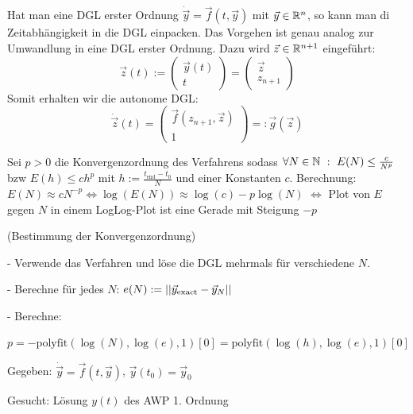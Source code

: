 
Hat man eine DGL erster Ordnung $\dot{\vec{y}} = \vec{f}(t,\vec{y})$ mit $\vec{y} \in \mathbb{R}^n$,
so kann man di Zeitabhängigkeit in die DGL einpacken. Das Vorgehen ist genau analog zur
Umwandlung in eine DGL erster Ordnung. Dazu wird $\vec{z} \in \mathbb{R}^{n+1}$ eingeführt:
$$
    \vec{z} (t) := \begin{pmatrix}
        \vec{y} (t) \\ t
    \end{pmatrix}
    =
    \begin{pmatrix}
        \vec{z} \\ z_{n+1}
    \end{pmatrix}
$$
Somit erhalten wir die autonome DGL:
$$
    \dot{\vec{z}} (t) = \begin{pmatrix}
        \vec{f} (z_{n+1} , \vec{z}) \\ 1
    \end{pmatrix}
    =: \vec{g} (\vec{z})
$$

\vspace{1\baselineskip}


Sei $p > 0$ die Konvergenzordnung des Verfahrens sodass $\forall N \in \mathbb{N} \ : \
E(N) \leq \frac{c}{N^p}$ bzw $E(h) \leq c h^p$ mit $h:= \frac{t_{\text{end}} - t_{0}}{N}$
und einer Konstanten $c$. Berechnung: $E(N) \approx c N^{-p} \Leftrightarrow
\log(E(N)) \approx \log(c) - p \log(N)$ $\Leftrightarrow$ Plot von $E$ gegen $N$ in einem
LogLog-Plot ist eine Gerade mit Steigung $-p$

\vspace{1\baselineskip}

 (Bestimmung der Konvergenzordnung)

- Verwende das Verfahren und löse die DGL mehrmals für verschiedene $N$.

- Berechne für jedes $N$: $e(N) := \left\vert\left\vert \vec{y}_{\text{exact}} - \vec{y}_N \right\vert\right\vert$

- Berechne:

$p = - \text{polyfit} (\log(N) , \log(e), 1)[0] = \text{polyfit} (\log(h),\log(e),1)[0]$

\vspace{1\baselineskip}

\underline{}

Gegeben: $\dot{\vec{y}} = \vec{f}(t,\vec{y})$, $\vec{y}(t_0) = \vec{y}_0$

Gesucht: Lösung $y(t)$ des AWP 1. Ordnung

